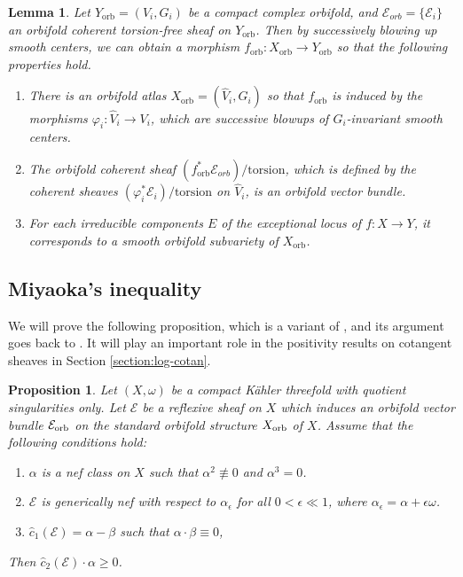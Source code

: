 \documentclass[12pt]{amsart}
\newcommand{\<}{\leq}
\def\>{\geq}
\newcommand{\num}{\equiv}
\def\mcE{\mathcal{E}}
\newtheorem{lemma}[theorem]{Lemma}
\newtheorem{proposition}[theorem]{Proposition}
\theoremstyle{remark}
\theoremstyle{definition}
\theoremstyle{definition}
\numberwithin{equation}{section}
\theoremstyle{definition}
\theoremstyle{definition}
\def\orb{\mathrm{orb}}
\begin{document}
\begin{lemma}
\label{lemma:orbifold-res-torfree}
Let $Y_{\orb}={(V_i,G_i)}$ be a compact complex orbifold, and $\mcE_{orb} = \{\mcE_i\}$ an orbifold coherent torsion-free sheaf on $Y_{\orb}$. 
Then by successively blowing up smooth centers, we can obtain a morphism $f_{\orb} \colon X_{\orb} \to Y_{\orb}$ so that the following properties hold. 
\begin{enumerate}
    \item There is an orbifold atlas  $X_{\orb} = {(\widehat{V}_i,G_i)}$ so that $f_{\orb}$ is induced by the morphisms  $\varphi_i\colon \widehat{V}_i \to V_i$, which are  successive blowups of $G_i$-invariant smooth centers.
    \item The orbifold coherent sheaf $(f_{\orb}^*\mcE_{orb})/\mathrm{torsion}$, which is defined by the coherent sheaves 
    $(\varphi_i^*\mcE_i)/\mathrm{torsion}$ on $\widehat{V}_i$, is an orbifold vector bundle. 
    \item For each irreducible components $E$ of the exceptional locus of $f \colon X \to Y$, it corresponds to a smooth orbifold subvariety of $X_{\orb}$. 
\end{enumerate}
\end{lemma}


 
 

\subsection{Miyaoka's inequality }


We will prove  the   following proposition, 
which is a variant of \cite[Theorem 7.11]{CHP16}, and its argument goes back to  \cite[Theorem 6.1]{Miy87}. 
It will play an important role in the  positivity results on cotangent sheaves in Section \ref{section:log-cotan}. 

\begin{proposition}
\label{prop:psef-c2-general}
Let $(X,\omega)$ be a compact K\"ahler threefold with quotient singularities only. 
Let $\mcE$ be a reflexive sheaf on $X$ which induces an orbifold vector bundle $\mcE_{\rm orb}$ on the standard orbifold structure $X_{\rm orb}$ of $X$.  
Assume that the following conditions hold:
\begin{enumerate}
\item $\alpha$ is a nef class on $X$ such that $\alpha^{2} \not\num 0$ and $\alpha^3=0$. 
\item $\mcE$ is generically nef with respect to $\alpha_\epsilon $ for all $0<\epsilon\ll 1$, where $\alpha_\epsilon = \alpha+\epsilon \omega$. 
\item $\hat{c}_1(\mcE) = \alpha - \beta$ such that $\alpha \cdot \beta\num 0$, 
\end{enumerate} 
Then $\hat{c}_2(\mcE) \cdot \alpha \> 0$.
\end{proposition}
\end{document}
